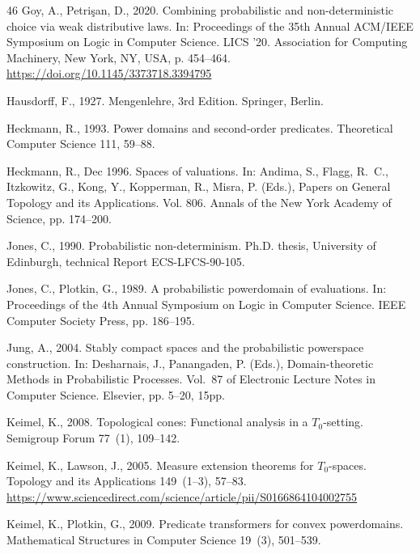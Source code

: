 \documentclass[preprint,12pt]{elsarticle}
\begin{document}
\begin{thebibliography}{46}
Goy, A., Petri\c{s}an, D., 2020. Combining probabilistic and non-deterministic
  choice via weak distributive laws. In: Proceedings of the 35th Annual
  ACM/IEEE Symposium on Logic in Computer Science. LICS '20. Association for
  Computing Machinery, New York, NY, USA, p. 454–464.
\newline\urlprefix\url{https://doi.org/10.1145/3373718.3394795}

Hausdorff, F., 1927. {M}engenlehre, 3rd Edition. Springer, Berlin.

Heckmann, R., 1993. Power domains and second-order predicates. Theoretical
  Computer Science 111, 59--88.

Heckmann, R., Dec 1996. Spaces of valuations. In: Andima, S., Flagg, R.~C.,
  Itzkowitz, G., Kong, Y., Kopperman, R., Misra, P. (Eds.), Papers on General
  Topology and its Applications. Vol. 806. Annals of the New York Academy of
  Science, pp. 174--200.

Jones, C., 1990. Probabilistic non-determinism. Ph.D. thesis, University of
  Edinburgh, technical Report ECS-LFCS-90-105.

Jones, C., Plotkin, G., 1989. A probabilistic powerdomain of evaluations. In:
  Proceedings of the 4th Annual Symposium on Logic in Computer Science. IEEE
  Computer Society Press, pp. 186--195.

Jung, A., 2004. Stably compact spaces and the probabilistic powerspace
  construction. In: Desharnais, J., Panangaden, P. (Eds.), Domain-theoretic
  Methods in Probabilistic Processes. Vol.~87 of Electronic Lecture Notes in
  Computer Science. Elsevier, pp. 5--20, 15pp.

Keimel, K., 2008. Topological cones: Functional analysis in a {$T_0$}-setting.
  Semigroup Forum 77~(1), 109--142.

Keimel, K., Lawson, J., 2005. Measure extension theorems for ${T_0}$-spaces.
  Topology and its Applications 149~(1--3), 57--83.
\newline\urlprefix\url{https://www.sciencedirect.com/science/article/pii/S0166864104002755}

Keimel, K., Plotkin, G., 2009. Predicate transformers for convex powerdomains.
  Mathematical Structures in Computer Science 19~(3), 501--539.


\end{thebibliography}
\end{document}
